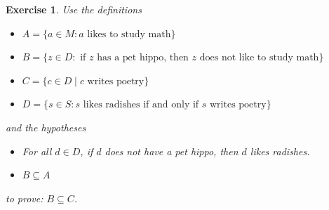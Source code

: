 \documentclass{book}
\newcounter{ekcounter}%
\theoremstyle{ekimcustom}
\newtheorem{exercise}[ekcounter]{Exercise}
\begin{document}
\begin{exercise}
Use the definitions
\begin{itemize}
\item $A = \{a \in M: a \text{ likes to study math}\}$
\item $B = \{z \in D: \text{ if } z \text{ has a pet hippo, then } z \text{ does not like to study math}\}$
\item $C = \{c \in D \mid c \text{ writes poetry}\}$
\item $D = \{s \in S : s \text{ likes radishes if and only if } s \text{ writes poetry}\}$
\end{itemize}
and the hypotheses
\begin{itemize}
\item For all $d \in D$, if $d$ does not have a pet hippo, then $d$ likes radishes.
\item $B \subseteq A$
\end{itemize}
to prove: $B \subseteq C$.
\end{exercise}
\end{document}
